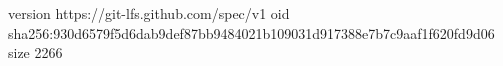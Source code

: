 version https://git-lfs.github.com/spec/v1
oid sha256:930d6579f5d6dab9def87bb9484021b109031d917388e7b7c9aaf1f620fd9d06
size 2266
